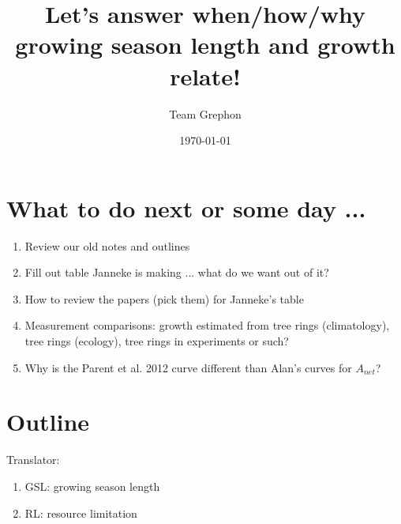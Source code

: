\documentclass[11pt,letter]{article}
\begin{document}

\renewcommand{\refname}{\CHead{}}

\title{Let's answer when/how/why growing season length and growth relate!}
\author{Team Grephon}
\date{\today}
\maketitle

\tableofcontents

\section{What to do next or some day ...}

\begin{enumerate}
\item Review our old notes and outlines
\item Fill out table Janneke is making ... what do we want out of it?
\item How to review the papers (pick them) for Janneke's table
\item Measurement comparisons: growth estimated from tree rings (climatology), tree rings (ecology), tree rings in experiments or such?
\item Why is the Parent et al. 2012 curve different than Alan's curves for $A_{net}$?
\end{enumerate}


\section{Outline}

Translator:
\begin{enumerate}
\item GSL: growing season length
\item RL: resource limitation
\end{enumerate}
\end{document}
